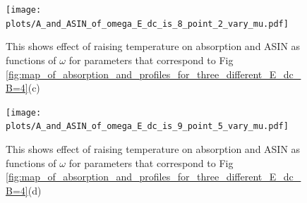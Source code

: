 \documentclass[40pt,letterpaper,physrev]{article}
\begin{document}
	\begin{figure}[H]
	  \centering
	  \normalsize %
	  \texttt{[image: plots/A\_and\_ASIN\_of\_omega\_E\_dc\_is\_8\_point\_2\_vary\_mu.pdf]}
	  \caption{This shows effect of raising temperature on absorption and ASIN as functions of $\omega$ for parameters that 
	  correspond to Fig \ref{fig:map_of_absorption_and_profiles_for_three_different_E_dc_B=4}(c)}
	  \label{fig:E_dc=8.2_B=4_different_mu}	  
	\end{figure}
	\newpage
	\begin{figure}[t]
	  \centering
	  \normalsize %
	  \texttt{[image: plots/A\_and\_ASIN\_of\_omega\_E\_dc\_is\_9\_point\_5\_vary\_mu.pdf]}
	  \caption{This shows effect of raising temperature on absorption and ASIN as functions of $\omega$ for parameters that 
	  correspond to Fig \ref{fig:map_of_absorption_and_profiles_for_three_different_E_dc_B=4}(d)}
	  \label{fig:E_dc=9.5_B=4_different_mu}	  
	\end{figure}
	\newpage
	
\end{document}
